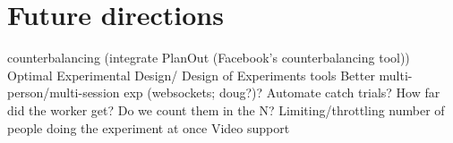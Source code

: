 \documentclass[jou,apacite]{apa6}
\begin{document}
\section{Future directions}
counterbalancing (integrate PlanOut (Facebook's counterbalancing tool))
Optimal Experimental Design/ Design of Experiments tools
Better multi-person/multi-session exp (websockets; doug?)?
Automate catch trials? How far did the worker get? Do we count them in the N? 
Limiting/throttling number of people doing the experiment at once
Video support


\end{document}

